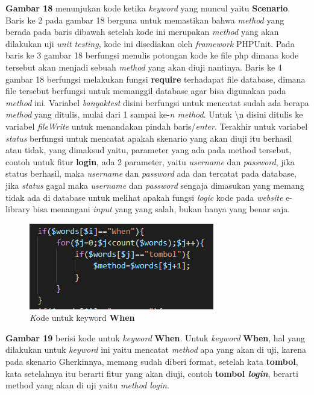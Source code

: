\documentclass[a4paper,twoside]{article}
\begin{document}
\begin{enumerate}
\textbf{Gambar 18} menunjukan kode ketika \textit{keyword} yang muncul yaitu \textbf{Scenario}. Baris ke 2 pada gambar 18 berguna untuk memastikan bahwa \textit{method} yang berada pada baris dibawah setelah kode ini merupakan \textit{method} yang akan dilakukan uji \textit{unit testing}, kode ini disediakan oleh \textit{framework} PHPUnit. Pada baris ke 3 gambar 18 berfungsi menulis potongan kode ke file php dimana kode tersebut akan menjadi sebuah \textit{method} yang akan diuji nantinya. Baris ke 4 gambar 18 berfungsi melakukan fungsi \textbf{require} terhadapat file database, dimana file tersebut berfungsi untuk memanggil database agar bisa digunakan pada \textit{method} ini. Variabel \textit{banyaktest} disini berfungsi untuk mencatat sudah ada berapa \textit{method} yang ditulis, mulai dari 1 sampai ke-\textit{n method}. Untuk \textbackslash n disini ditulis ke variabel \textit{fileWrite} untuk menandakan pindah baris/\textit{enter}. Terakhir untuk variabel \textit{status} berfungsi untuk mencatat apakah skenario yang akan diuji itu berhasil atau tidak, yang dimaksud yaitu, parameter yang ada pada method tersebut, contoh untuk fitur \textbf{login}, ada 2 parameter, yaitu \textit{username} dan \textit{password}, jika status berhasil, maka \textit{username} dan \textit{password} ada dan tercatat pada database, jika \textit{status} gagal maka \textit{username} dan \textit{password} sengaja dimasukan yang memang tidak ada di database untuk melihat apakah fungsi \textit{logic} kode pada \textit{website} e-library bisa menangani \textit{input} yang yang salah, bukan hanya yang benar saja.

\begin{figure}[h!]
			\includegraphics[scale=1.00]{../DokumenSkripsi/gambar/implementasi8}
			\centering
			\caption{\textit Kode untuk keyword \textbf{When}}
		\end{figure}

\textbf{Gambar 19} berisi kode untuk \textit{keyword} \textbf{When}. Untuk \textit{keyword} \textbf{When}, hal yang dilakukan untuk \textit{keyword} ini yaitu mencatat \textit{method} apa yang akan di uji, karena pada skenario Gherkinnya, memang sudah diberi format, setelah kata \textbf{tombol}, kata setelahnya itu berarti fitur yang akan diuji, contoh \textbf{tombol \textit{login}}, berarti method yang akan di uji yaitu \textit{method login}.


\end{enumerate}
\end{document}
